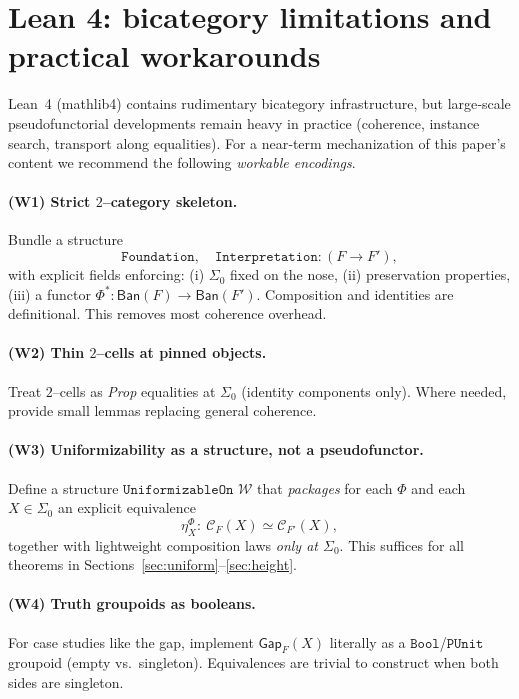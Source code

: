 \documentclass[11pt]{article}
\theoremstyle{definition}
\theoremstyle{remark}
\newcommand{\Ban}{\mathsf{Ban}}
\newcommand{\SigmaZero}{\Sigma_{0}}
\begin{document}
\section{Lean 4: bicategory limitations and practical workarounds}\label{sec:lean}

Lean~4 (mathlib4) contains rudimentary bicategory infrastructure, but large‑scale pseudofunctorial developments remain heavy in practice (coherence, instance search, transport along equalities). For a near‑term mechanization of this paper’s content we recommend the following \emph{workable encodings}.

\paragraph{(W1) Strict $2$--category skeleton.}
Bundle a structure
\[
  \texttt{Foundation},\quad \texttt{Interpretation}:(F\to F'),
\]
with explicit fields enforcing: (i) \(\SigmaZero\) fixed on the nose, (ii) preservation properties, (iii) a functor \(\Phi^*:\Ban(F)\to\Ban(F')\). Composition and identities are definitional. This removes most coherence overhead.

\paragraph{(W2) Thin $2$--cells at pinned objects.}
Treat $2$--cells as \emph{Prop} equalities at \(\SigmaZero\) (identity components only). Where needed, provide small lemmas replacing general coherence.

\paragraph{(W3) Uniformizability as a structure, not a pseudofunctor.}
Define a structure \(\texttt{UniformizableOn } \mathcal W\) that \emph{packages} for each \(\Phi\) and each \(X\in\SigmaZero\) an explicit equivalence
\[
  \eta^\Phi_X:\ \mathcal C_F(X)\simeq\mathcal C_{F'}(X),
\]
together with lightweight composition laws \emph{only at \(\SigmaZero\)}. This suffices for all theorems in Sections~\ref{sec:uniform}--\ref{sec:height}.

\paragraph{(W4) Truth groupoids as booleans.}
For case studies like the gap, implement \(\mathsf{Gap}_F(X)\) literally as a \(\texttt{Bool}\)/\(\texttt{PUnit}\) groupoid (empty vs.\ singleton). Equivalences are trivial to construct when both sides are singleton.
\end{document}
